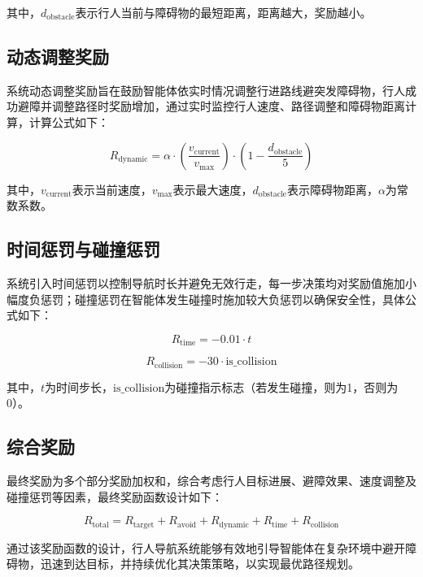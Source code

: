 其中，$d_{\text{obstacle}}$表示行人当前与障碍物的最短距离，距离越大，奖励越小。

\subsection{动态调整奖励}
系统动态调整奖励旨在鼓励智能体依实时情况调整行进路线避突发障碍物，行人成功避障并调整路径时奖励增加，通过实时监控行人速度、路径调整和障碍物距离计算，计算公式如下：

\begin{equation}
R_{\text{dynamic}} = \alpha \cdot \left( \frac{v_{\text{current}}}{v_{\text{max}}} \right) \cdot \left( 1 - \frac{d_{\text{obstacle}}}{5} \right)
\end{equation}

其中，$v_{\text{current}}$表示当前速度，$v_{\text{max}}$表示最大速度，$d_{\text{obstacle}}$表示障碍物距离，$\alpha$为常数系数。

\subsection{时间惩罚与碰撞惩罚}
系统引入时间惩罚以控制导航时长并避免无效行走，每一步决策均对奖励值施加小幅度负惩罚；碰撞惩罚在智能体发生碰撞时施加较大负惩罚以确保安全性，具体公式如下：

\begin{equation}
R_{\text{time}} = - 0.01 \cdot t
\end{equation}

\begin{equation}
R_{\text{collision}} = - 30 \cdot \text{is\_collision}
\end{equation}

其中，$t$为时间步长，$\text{is\_collision}$为碰撞指示标志（若发生碰撞，则为1，否则为0）。

\subsection{综合奖励}
最终奖励为多个部分奖励加权和，综合考虑行人目标进展、避障效果、速度调整及碰撞惩罚等因素，最终奖励函数设计如下：

\begin{equation}
R_{\text{total}} = R_{\text{target}} + R_{\text{avoid}} + R_{\text{dynamic}} + R_{\text{time}} + R_{\text{collision}}
\end{equation}

通过该奖励函数的设计，行人导航系统能够有效地引导智能体在复杂环境中避开障碍物，迅速到达目标，并持续优化其决策策略，以实现最优路径规划。

